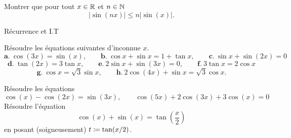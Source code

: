 \documentclass{magnolia}
\begin{document}
Montrer que pour tout $x\in \mathbb{R}$ et $n \in \mathbb{N}$
\[|\sin(nx)| \leq n |\sin(x)|.\]
\begin{sol}
Récurrence et I.T
\end{sol}

Résoudre les équations suivantes d'inconnue $x$.
\[\textbf{a.}\ \cos(3x)=\sin(x), \qquad \textbf{b.}\ \cos x+\sin x=1+\tan x,\qquad \textbf{c.}\ \sin x+\sin(2x)=0\]
\[\textbf{d.}\ \tan(2x)=3\tan x,\qquad \textbf{e.}\ 2\sin x+\sin(3x)=0,\qquad \textbf{f.}\ 3\tan x=2\cos x\]
\[\textbf{g.}\ \cos x=\sqrt{3}\sin x, \qquad \textbf{h.}\ 2\cos(4x)+\sin x=\sqrt{3}\cos x.\]


\begin{questions}
\question Résoudre les équations \[\cos(x)-\cos(2x)=\sin(3x), \qquad \cos(5x)+2\cos (3x)+3\cos(x)=0\]
\question Résoudre l'équation
  \[\cos(x)+\sin(x)=\tan \left( \frac{x}{2} \right)\]
  en posant (soigneusement) $t\coloneqq\tan(x/2)$.
\end{questions}
\end{document}

